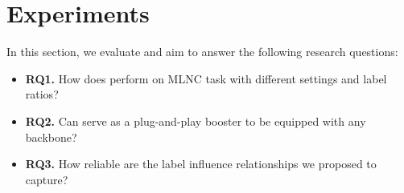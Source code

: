 \section{Experiments}  
In this section, we evaluate \model and aim to answer the following research questions:
\begin{itemize}[leftmargin=*]
\item \textbf{RQ1.} How does \model perform on MLNC task with different settings and label ratios?
\item \textbf{RQ2.} Can \model serve as a plug-and-play booster to be equipped with any backbone?
\item \textbf{RQ3.} How reliable are the label influence relationships we proposed to capture?
\end{itemize}



